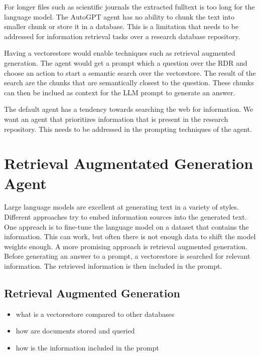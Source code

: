 \documentclass[english, version-2022-01]{uzl-thesis}
\begin{document}
For longer files such as scientific journals the extracted fulltext is too long for the language model. The AutoGPT agent has no ability to chunk the text into smaller chunk or store it in a database. This is a limitation that needs to be addressed for information retrieval tasks over a research database repository.

Having a vectorestore would enable techniques such as retrieval augmented generation. The agent would get a prompt which a question over the RDR and choose an action to start a semantic search over the vectorstore. The result of the search are the chunks that are semantically closest to the question. These chunks can then be inclued as context for the LLM prompt to generate an answer.

The default agent has a tendency towards searching the web for information. We want an agent that prioritizes information that is present in the research repository. This needs to be addressed in the prompting techniques of the agent.

\chapter{Retrieval Augmentated Generation Agent}

Large language models are excellent at generating text in a variety of styles. Different approaches try to embed information sources into the generated text. One appreach is to fine-tune the language model on a dataset that contains the information. This can work, but often there is not enough data to shift the model weights enough. A more promising approach is retrieval augmented generation. Before generating an answer to a prompt, a vectorestore is searched for relevant information. The retrieved information is then included in the prompt.

\section{Retrieval Augmented Generation}

\begin{itemize}
	\item what is a vectorestore compared to other databases
	\item how are documents stored and queried
	\item how is the information included in the prompt
\end{itemize}
\end{document}
